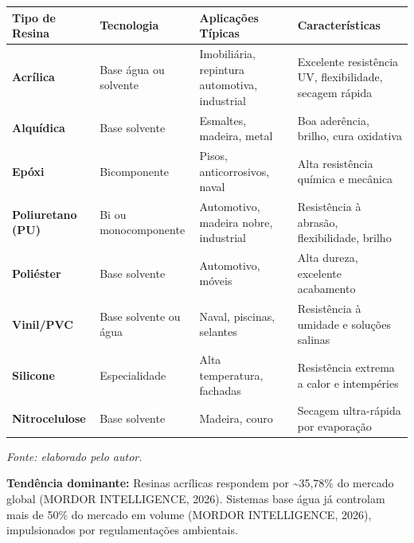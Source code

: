 \documentclass[
  12pt,
  a4paper,
  oneside,
  brazil,
  chapter=TITLE
]{article}
\newcommand{\quadrofonte}[1]{\par\noindent\textit{Fonte: #1}\vspace{1em}\par}
\begin{document}
{\def\LTcaptype{none} %
\begin{longtable}[]{@{}
  >{\raggedright\arraybackslash}p{}
  >{\raggedright\arraybackslash}p{}
  >{\raggedright\arraybackslash}p{}
  >{\raggedright\arraybackslash}p{}@{}}
\toprule\noalign{}
\begin{minipage}[b]{\linewidth}\raggedright
Tipo de Resina
\end{minipage} & \begin{minipage}[b]{\linewidth}\raggedright
Tecnologia
\end{minipage} & \begin{minipage}[b]{\linewidth}\raggedright
Aplicações Típicas
\end{minipage} & \begin{minipage}[b]{\linewidth}\raggedright
Características
\end{minipage} \\
\midrule\noalign{}
\endhead
\bottomrule\noalign{}
\endlastfoot
\textbf{Acrílica} & Base água ou solvente & Imobiliária, repintura
automotiva, industrial & Excelente resistência UV, flexibilidade,
secagem rápida \\
\textbf{Alquídica} & Base solvente & Esmaltes, madeira, metal & Boa
aderência, brilho, cura oxidativa \\
\textbf{Epóxi} & Bicomponente & Pisos, anticorrosivos, naval & Alta
resistência química e mecânica \\
\textbf{Poliuretano (PU)} & Bi ou monocomponente & Automotivo, madeira
nobre, industrial & Resistência à abrasão, flexibilidade, brilho \\
\textbf{Poliéster} & Base solvente & Automotivo, móveis & Alta dureza,
excelente acabamento \\
\textbf{Vinil/PVC} & Base solvente ou água & Naval, piscinas, selantes &
Resistência à umidade e soluções salinas \\
\textbf{Silicone} & Especialidade & Alta temperatura, fachadas &
Resistência extrema a calor e intempéries \\
\textbf{Nitrocelulose} & Base solvente & Madeira, couro & Secagem
ultra-rápida por evaporação \\
\end{longtable}
}

\quadrofonte{elaborado pelo autor.}

\textbf{Tendência dominante:} Resinas acrílicas respondem por
\textasciitilde35,78\% do mercado global (MORDOR INTELLIGENCE, 2026).
Sistemas base água já controlam mais de 50\% do mercado em volume
(MORDOR INTELLIGENCE, 2026), impulsionados por regulamentações
ambientais.
\end{document}

